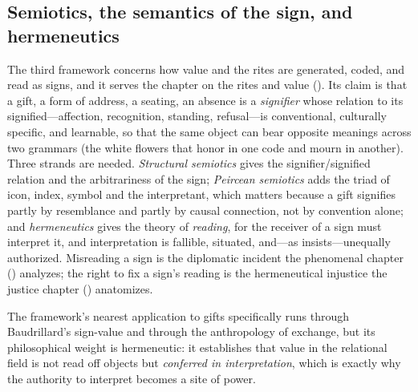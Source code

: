 \subsection{Semiotics, the semantics of the sign, and hermeneutics}
The third framework concerns how value and the rites are generated, coded, and read as signs, and it serves the chapter on the rites and value (). Its claim is that a gift, a form of address, a seating, an absence is a \emph{signifier} whose relation to its signified---affection, recognition, standing, refusal---is conventional, culturally specific, and learnable, so that the same object can bear opposite meanings across two grammars (the white flowers that honor in one code and mourn in another). Three strands are needed. \emph{Structural semiotics} \parencite{saussure1916} gives the signifier/signified relation and the arbitrariness of the sign; \emph{Peircean semiotics} \parencite{peirce_cp} adds the triad of icon, index, symbol and the interpretant, which matters because a gift signifies partly by resemblance and partly by causal connection, not by convention alone; and \emph{hermeneutics} \parencite{ricoeur1976,gadamer1960} gives the theory of \emph{reading}, for the receiver of a sign must interpret it, and interpretation is fallible, situated, and---as  insists---unequally authorized. Misreading a sign is the diplomatic incident the phenomenal chapter () analyzes; the right to fix a sign's reading is the hermeneutical injustice the justice chapter () anatomizes.

The framework's nearest application to gifts specifically runs through Baudrillard's sign-value \parencite{baudrillard1972} and through the anthropology of exchange, but its philosophical weight is hermeneutic: it establishes that value in the relational field is not read off objects but \emph{conferred in interpretation}, which is exactly why the authority to interpret becomes a site of power.

